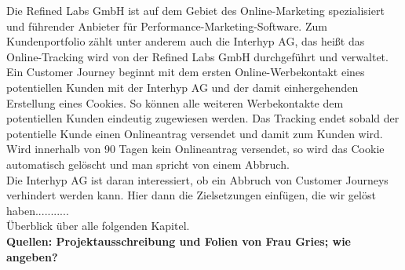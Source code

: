 Die Refined Labs GmbH ist auf dem Gebiet des Online-Marketing spezialisiert und führender Anbieter für Performance-Marketing-Software. Zum Kundenportfolio zählt unter anderem auch die Interhyp AG, das heißt das Online-Tracking wird von der Refined Labs GmbH durchgeführt und verwaltet. Ein Customer Journey beginnt mit dem ersten Online-Werbekontakt eines potentiellen Kunden mit der Interhyp AG und der damit einhergehenden Erstellung eines Cookies. So können alle weiteren Werbekontakte dem potentiellen Kunden eindeutig zugewiesen werden. Das Tracking endet sobald der potentielle Kunde einen Onlineantrag versendet und damit zum Kunden wird. Wird innerhalb von 90 Tagen kein Onlineantrag versendet, so wird das Cookie automatisch gelöscht und man spricht von einem Abbruch.\\
Die Interhyp AG ist daran interessiert, ob ein Abbruch von Customer Journeys verhindert werden kann. Hier dann die Zielsetzungen einfügen, die wir gelöst haben...........\\
Überblick über alle folgenden Kapitel.\\
\textbf{Quellen: Projektausschreibung und Folien von Frau Gries; wie angeben?}\\
